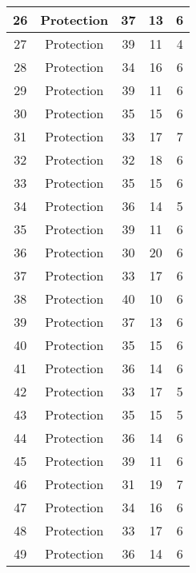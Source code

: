 \documentclass[results.tex]{subfiles}
\begin{document}
\begin{center}
\begin{tabular}{| c || c | c | c | c |}
    \hline
    26 & Protection & 37 & 13 & 6 \\ 
    \hline
    27 & Protection & 39 & 11 & 4 \\ 
    \hline
    28 & Protection & 34 & 16 & 6 \\ 
    \hline
    29 & Protection & 39 & 11 & 6 \\ 
    \hline
    30 & Protection & 35 & 15 & 6 \\ 
    \hline
    31 & Protection & 33 & 17 & 7 \\ 
    \hline
    32 & Protection & 32 & 18 & 6 \\ 
    \hline
    33 & Protection & 35 & 15 & 6 \\ 
    \hline
    34 & Protection & 36 & 14 & 5 \\ 
    \hline
    35 & Protection & 39 & 11 & 6 \\ 
    \hline
    36 & Protection & 30 & 20 & 6 \\ 
    \hline
    37 & Protection & 33 & 17 & 6 \\ 
    \hline
    38 & Protection & 40 & 10 & 6 \\ 
    \hline
    39 & Protection & 37 & 13 & 6 \\ 
    \hline
    40 & Protection & 35 & 15 & 6 \\ 
    \hline
    41 & Protection & 36 & 14 & 6 \\ 
    \hline
    42 & Protection & 33 & 17 & 5 \\ 
    \hline
    43 & Protection & 35 & 15 & 5 \\ 
    \hline
    44 & Protection & 36 & 14 & 6 \\ 
    \hline
    45 & Protection & 39 & 11 & 6 \\ 
    \hline
    46 & Protection & 31 & 19 & 7 \\ 
    \hline
    47 & Protection & 34 & 16 & 6 \\ 
    \hline
    48 & Protection & 33 & 17 & 6 \\ 
    \hline
    49 & Protection & 36 & 14 & 6 \\ 
    \hline   \end{tabular}
\end{center}
\end{document}

